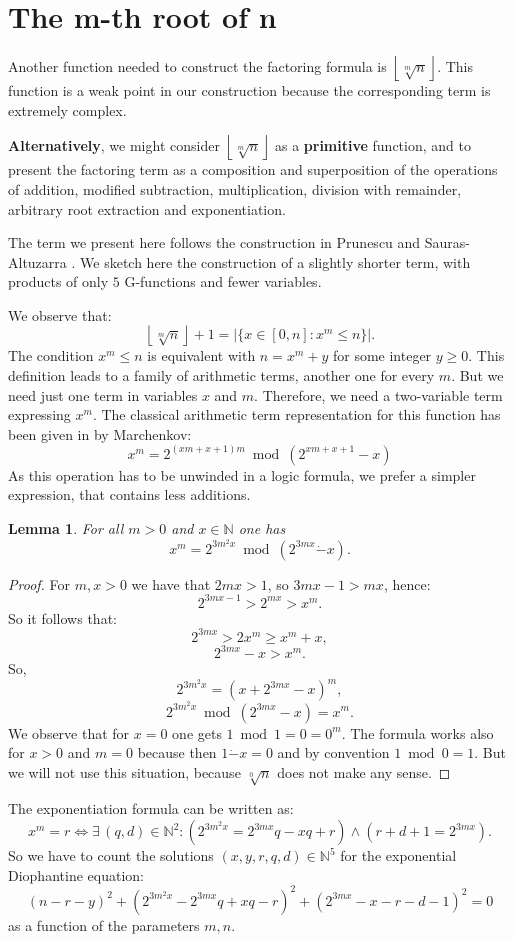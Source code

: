 \documentclass[10pt]{article}
\theoremstyle{plain}
\newtheorem{lemma}{Lemma}[section]
\begin{document}
\section{The m-th root of n}\label{sectionmthrootofn}

Another function needed to construct the factoring formula is $ \left\lfloor \sqrt[m]{n} \right\rfloor $. This function is a weak point in our construction because the corresponding term is extremely complex.

{\bf Alternatively}, we might consider $ \left\lfloor \sqrt[m]{n} \right\rfloor $ as a {\bf primitive} function, and to present the factoring term as a composition and superposition of the operations of addition, modified subtraction, multiplication, division with remainder, arbitrary root extraction and exponentiation.

The term we present here follows the construction in Prunescu and Sauras-Altuzarra \citep[Theorem 8.3]{prunescu2024numbertheoreticfunctions}. We sketch here the construction of a slightly shorter term, with products of only $5$ G-functions and fewer variables.

We observe that:
$$\left\lfloor \sqrt[m]{n} \right\rfloor + 1 = |\{x \in [0,n] : x^m \leq n\}|.$$
The condition $x^m \leq n$ is equivalent with $n = x^m + y$ for some  integer $y \geq 0$.
This definition leads to a family of arithmetic terms, another one for every $m$. But we need just one term in variables $x$ and $m$. Therefore, we need a two-variable term expressing $x^m$. The classical arithmetic term representation for this function has been given in \cite{marchenkov2007superposition} by Marchenkov:
$$x^m = 2^{(xm+x+1)m} \bmod \left ( 2^{xm+x+1} - x \right ) $$
As this operation has to be unwinded in a logic formula, we prefer a simpler expression, that contains less additions.
\begin{lemma} For all $m > 0$ and $x \in \mathbb N$ one has
$$x^m = 2^{3m^2 x} \bmod ( 2^{3mx} \dot{-} x ).$$
\end{lemma}
\begin{proof}
    For $m, x > 0$ we have that $2mx > 1$, so $3mx-1 > mx$, hence:
    $$2^{3mx-1} > 2^{mx} > x^m.$$
    So it follows that:
    $$2^{3mx}> 2x^m \geq x^m + x,$$
    $$2^{3mx} - x > x^m.$$
    So,
    $$2^{3m^2x} = ( x + 2^{3mx} - x)^m,$$
    $$2^{3m^2 x} \bmod ( 2^{3mx} - x ) = x^m.$$
    We observe that for $x = 0$ one gets $1 \bmod 1 = 0 = 0^m$. The formula works also for $x > 0$ and $m = 0$ because then $1 \dot{-} x = 0$ and by convention $1 \bmod 0 = 1$. But we will not use this situation, because $\sqrt[0]{n}$ does not make any sense.
\end{proof}
The exponentiation formula can be written as:
\[x^m = r \iff \exists \, (q, d) \in \mathbb{N}^2 :
    (2^{3m^2 x} = 2^{3mx} q - xq + r) \wedge (r + d + 1 = 2^{3mx} ).
\]
So we have to count the solutions $(x,y,r,q,d) \in \mathbb N^5$ for the exponential Diophantine equation:
$$(n-r-y)^2 + (2^{3m^2 x} - 2^{3mx} q + xq - r)^2 +(2^{3mx} - x - r - d - 1)^2 = 0$$
as a function of the parameters $m, n$.
\end{document}
